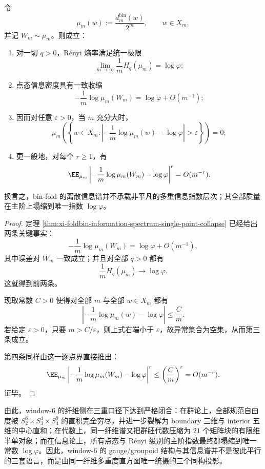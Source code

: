 \begin{theorem}\label{thm:xi-time-part9zf-binfold-information-spectrum-moment-collapse}
令
\[
\mu_m(w):=\frac{d_m^{\mathrm{bin}}(w)}{2^m},
\qquad
w\in X_m,
\]
并记 \(W_m\sim \mu_m\)。则成立：
\begin{enumerate}
  \item 对一切 \(q>0\)，Rényi 熵率满足统一极限
  \[
  \lim_{m\to\infty}\frac{1}{m}H_q(\mu_m)=\log\varphi;
  \]
  \item 点态信息密度具有一致收缩
  \[
  -\frac{1}{m}\log \mu_m(W_m)=\log\varphi+O(m^{-1});
  \]
  \item 因而对任意 \(\varepsilon>0\)，当 \(m\) 充分大时，
  \[
  \mu_m\!\left(
  \left\{
  w\in X_m:
  \left|
  -\frac{1}{m}\log \mu_m(w)-\log\varphi
  \right|>\varepsilon
  \right\}
  \right)=0;
  \]
  \item 更一般地，对每个 \(r\ge 1\)，有
  \[
  \EE_{\mu_m}\left|
  -\frac{1}{m}\log \mu_m(W_m)-\log\varphi
  \right|^r
  =O(m^{-r}).
  \]
\end{enumerate}
换言之，bin-fold 的离散信息谱并不承载非平凡的多重信息指数层次；其全部质量在主阶上塌缩到唯一指数 \(\log\varphi\)。
\end{theorem}
\begin{proof}
定理 \ref{thm:xi-foldbin-information-spectrum-single-point-collapse} 已经给出两条关键事实：
\[
-\frac{1}{m}\log \mu_m(W_m)=\log\varphi+O(m^{-1}),
\]
其中误差对 \(W_m\) 一致成立；并且对全部 \(q>0\) 都有
\[
\frac{1}{m}H_q(\mu_m)\longrightarrow \log\varphi.
\]
这就得到前两条。

现取常数 \(C>0\) 使得对全部 \(m\) 与全部 \(w\in X_m\) 都有
\[
\left|
-\frac{1}{m}\log \mu_m(w)-\log\varphi
\right|
\le \frac{C}{m}.
\]
若给定 \(\varepsilon>0\)，只要 \(m>C/\varepsilon\)，则上式右端小于 \(\varepsilon\)，故异常集合为空集，从而第三条成立。

第四条同样由这一逐点界直接推出：
\[
\EE_{\mu_m}\left|
-\frac{1}{m}\log \mu_m(W_m)-\log\varphi
\right|^r
\le
\left(\frac{C}{m}\right)^r
=O(m^{-r}).
\]
证毕。
\end{proof}

\noindent
由此，window-\(6\) 的纤维侧在三重口径下达到严格闭合：在群论上，全部规范自由度被 \(S_2^{8}\times S_3^{4}\times S_4^{9}\) 的直积完全穷尽，并进一步裂解为 boundary 三维与 interior 五维的中心直和；在代数上，同一纤维谱又把群胚代数压缩为 \(21\) 个矩阵块的有限维半单对象；而在信息论上，所有点态与 Rényi 级别的主阶指数最终都塌缩到唯一常数 \(\log\varphi\)。因此，window-\(6\) 的 gauge/groupoid 结构与其信息谱并不是彼此平行的三套语言，而是由同一纤维多重度直方图唯一统摄的三个同构投影。

\endinput
